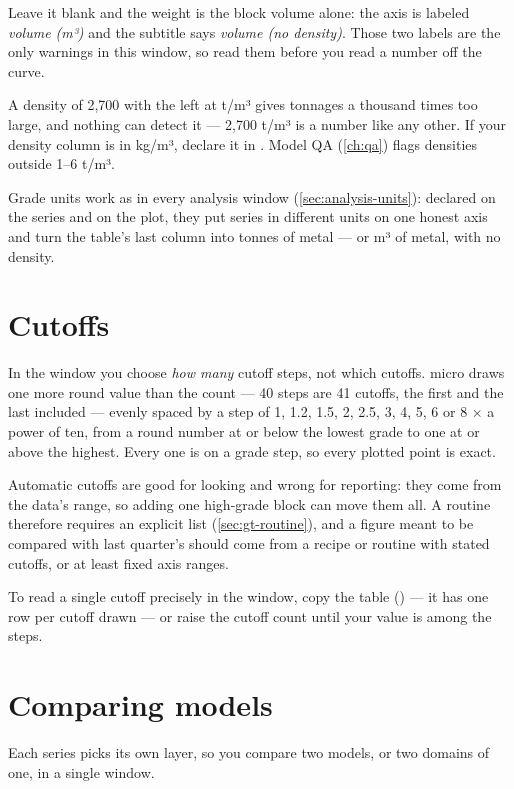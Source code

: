 Leave it blank and the weight is the block volume alone: the axis is labeled \emph{volume (m³)} and the subtitle says \emph{volume (no density)}. Those two labels are the only warnings in this window, so read them before you read a number off the curve.

\begin{caution}
A density of 2,700 with the  left at t/m³ gives tonnages a thousand times too large, and nothing can detect it — 2,700 t/m³ is a number like any other. If your density column is in kg/m³, declare it in . Model QA (\cref{ch:qa}) flags densities outside 1–6 t/m³.
\end{caution}

Grade units work as in every analysis window (\cref{sec:analysis-units}): declared on the series and on the plot, they put series in different units on one honest axis and turn the table's last column into tonnes of metal — or m³ of metal, with no density.

\section{Cutoffs}\label{sec:gt-cutoffs}
In the window you choose \emph{how many} cutoff steps, not which cutoffs. micro draws one more round value than the count — 40 steps are 41 cutoffs, the first and the last included — evenly spaced by a step of 1, 1.2, 1.5, 2, 2.5, 3, 4, 5, 6 or 8 × a power of ten, from a round number at or below the lowest grade to one at or above the highest. Every one is on a grade step, so every plotted point is exact.

Automatic cutoffs are good for looking and wrong for reporting: they come from the data's range, so adding one high-grade block can move them all. A routine therefore requires an explicit list (\cref{sec:gt-routine}), and a figure meant to be compared with last quarter's should come from a recipe or routine with stated cutoffs, or at least fixed axis ranges.

To read a single cutoff precisely in the window, copy the table () — it has one row per cutoff drawn — or raise the cutoff count until your value is among the steps.

\section{Comparing models}\label{sec:gt-compare}
Each series picks its own layer, so you compare two models, or two domains of one, in a single window.

